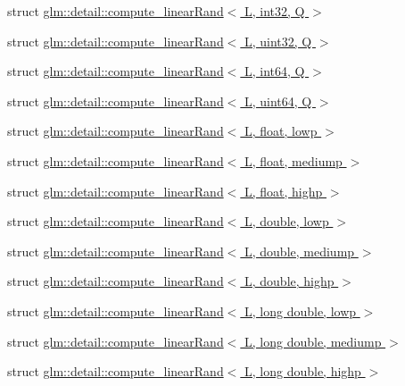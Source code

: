 \begin{DoxyCompactItemize}
\item 
struct \hyperlink{structglm_1_1detail_1_1compute__linearRand_3_01L_00_01int32_00_01Q_01_4}{glm\+::detail\+::compute\+\_\+linear\+Rand$<$ L, int32, Q $>$}
\item 
struct \hyperlink{structglm_1_1detail_1_1compute__linearRand_3_01L_00_01uint32_00_01Q_01_4}{glm\+::detail\+::compute\+\_\+linear\+Rand$<$ L, uint32, Q $>$}
\item 
struct \hyperlink{structglm_1_1detail_1_1compute__linearRand_3_01L_00_01int64_00_01Q_01_4}{glm\+::detail\+::compute\+\_\+linear\+Rand$<$ L, int64, Q $>$}
\item 
struct \hyperlink{structglm_1_1detail_1_1compute__linearRand_3_01L_00_01uint64_00_01Q_01_4}{glm\+::detail\+::compute\+\_\+linear\+Rand$<$ L, uint64, Q $>$}
\item 
struct \hyperlink{structglm_1_1detail_1_1compute__linearRand_3_01L_00_01float_00_01lowp_01_4}{glm\+::detail\+::compute\+\_\+linear\+Rand$<$ L, float, lowp $>$}
\item 
struct \hyperlink{structglm_1_1detail_1_1compute__linearRand_3_01L_00_01float_00_01mediump_01_4}{glm\+::detail\+::compute\+\_\+linear\+Rand$<$ L, float, mediump $>$}
\item 
struct \hyperlink{structglm_1_1detail_1_1compute__linearRand_3_01L_00_01float_00_01highp_01_4}{glm\+::detail\+::compute\+\_\+linear\+Rand$<$ L, float, highp $>$}
\item 
struct \hyperlink{structglm_1_1detail_1_1compute__linearRand_3_01L_00_01double_00_01lowp_01_4}{glm\+::detail\+::compute\+\_\+linear\+Rand$<$ L, double, lowp $>$}
\item 
struct \hyperlink{structglm_1_1detail_1_1compute__linearRand_3_01L_00_01double_00_01mediump_01_4}{glm\+::detail\+::compute\+\_\+linear\+Rand$<$ L, double, mediump $>$}
\item 
struct \hyperlink{structglm_1_1detail_1_1compute__linearRand_3_01L_00_01double_00_01highp_01_4}{glm\+::detail\+::compute\+\_\+linear\+Rand$<$ L, double, highp $>$}
\item 
struct \hyperlink{structglm_1_1detail_1_1compute__linearRand_3_01L_00_01long_01double_00_01lowp_01_4}{glm\+::detail\+::compute\+\_\+linear\+Rand$<$ L, long double, lowp $>$}
\item 
struct \hyperlink{structglm_1_1detail_1_1compute__linearRand_3_01L_00_01long_01double_00_01mediump_01_4}{glm\+::detail\+::compute\+\_\+linear\+Rand$<$ L, long double, mediump $>$}
\item 
struct \hyperlink{structglm_1_1detail_1_1compute__linearRand_3_01L_00_01long_01double_00_01highp_01_4}{glm\+::detail\+::compute\+\_\+linear\+Rand$<$ L, long double, highp $>$}
\end{DoxyCompactItemize}
